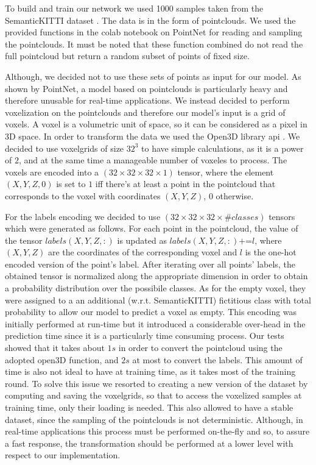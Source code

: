 To build and train our network we used 1000 samples taken from the SemanticKITTI dataset \cite{behley2019iccv}.
The data is in the form of pointclouds. We used the provided
functions in the colab notebook on PointNet for reading and sampling the pointclouds. It must be noted that these function combined
do not read the full pointcloud but return a random subset of points of fixed size.\par
Although, we decided not to use these sets of points as input for our model. As shown by PointNet,
a model based on pointclouds is particularly heavy and therefore unusable for real-time applications.
We instead decided to perform voxelization on the pointclouds and therefore our model's input is a grid of voxels.
A voxel is a volumetric unit of space, so it can be considered as a pixel in 3D space.
In order to transform the data we used the Open3D library api \cite{zhou2018open3d}. 
We decided to use voxelgrids of size $32^3$ to have simple calculations, as it is a power of $2$, and at the same time a manageable number of voxeles to process.
The voxels are encoded into a $(32\times32\times32\times1)$ tensor, where the element $(X,Y,Z,0)$ is set to $1$ iff there's at least a point in the pointcloud that corresponds to the voxel with coordinates $(X,Y,Z)$, 0 otherwise.\par
For the labels encoding we decided to use $(32\times32\times32\times\#classes)$ tensors which were generated as follows.
For each point in the pointcloud, the value of the tensor 
$labels(X,Y,Z,:)$ is updated as $labels(X,Y,Z,:)\textrm{+=}l$, where $(X,Y,Z)$ are the coordinates of the corresponding voxel and $l$ is the one-hot encoded version
of the point's label.
After iterating over all points' labels, the obtained tensor is normalized along the appropriate dimension in order to obtain a probability distribution over the possibile classes. 
As for the empty voxel, they were assigned to a an additional (w.r.t. SemanticKITTI) fictitious class with total probability to 
allow our model to predict a voxel as empty.
This encoding was initially performed at run-time but it introduced a considerable over-head in the prediction time since
it is a particularly time consuming process. Our tests showed that it takes about $1s$ in order to convert the pointcloud
using the adopted open3D function, and $2s$ at most to convert the labels. This amount of time
is also not ideal to have at training time, as it takes most of the training round. 
To solve this issue we resorted to creating a new version of the dataset by computing and saving the voxelgrids, so that to access the voxelized samples
at training time, only their loading is needed. This also allowed to have a stable dataset, since the sampling of the pointclouds
is not deterministic. Although, in real-time applications this process must be performed on-the-fly and so, to assure a fast response,
the transformation should be performed at a lower level with respect to our implementation.